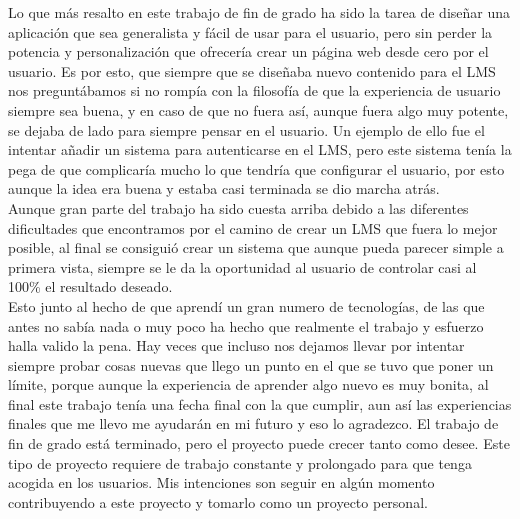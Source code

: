 Lo que más resalto en este trabajo de fin de grado ha sido la tarea de diseñar una aplicación que sea generalista y fácil de usar para el usuario, pero sin perder la potencia y personalización que ofrecería crear un página web desde cero por el usuario. Es por esto, que siempre que se diseñaba nuevo contenido para el LMS nos preguntábamos si no rompía con la filosofía de que la experiencia de usuario siempre sea buena, y en caso de que no fuera así, aunque fuera algo muy potente, se dejaba de lado para siempre pensar en el usuario. Un ejemplo de ello fue el intentar añadir un sistema para autenticarse en el LMS, pero este sistema tenía la pega de que complicaría mucho lo que tendría que configurar el usuario, por esto aunque la idea era buena y estaba casi terminada se dio marcha atrás. \\
Aunque gran parte del trabajo ha sido cuesta arriba debido a las diferentes dificultades que encontramos por el camino de crear un LMS que fuera lo mejor posible, al final se consiguió crear un sistema que aunque pueda parecer simple a primera vista, siempre se le da la oportunidad al usuario de controlar casi al 100\% el resultado deseado. \\
Esto junto al hecho de que aprendí un gran numero de tecnologías, de las que antes no sabía nada o muy poco ha hecho que realmente el trabajo y esfuerzo halla valido la pena. Hay veces que incluso nos dejamos llevar por intentar siempre probar cosas nuevas que llego un punto en el que se tuvo que poner un límite, porque aunque la experiencia de aprender algo nuevo es muy bonita, al final este trabajo tenía una fecha final con la que cumplir, aun así las experiencias finales que me llevo me ayudarán en mi futuro y eso lo agradezco.
El trabajo de fin de grado está terminado, pero el proyecto puede crecer tanto como desee. Este tipo de proyecto requiere de trabajo constante y prolongado para que tenga acogida en los usuarios. Mis intenciones son seguir en algún momento contribuyendo a este proyecto y tomarlo como un proyecto personal.